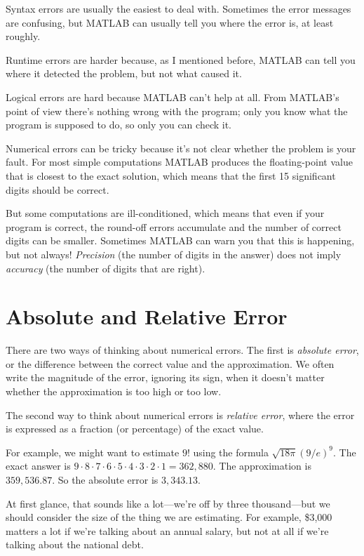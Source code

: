 Syntax errors are usually the easiest to deal with.  Sometimes the error messages
are confusing, but MATLAB can usually tell you where the error is, at
least roughly.

Runtime errors are harder because, as I mentioned before, MATLAB
can tell you where it detected the problem, but not what caused it.

Logical errors are hard because MATLAB can't help at all.  
From MATLAB's point of view there's nothing wrong with the program; only you
know what the program is supposed to do, so only you can check it.


Numerical errors can be tricky because it's not clear whether the
problem is your fault.  For most simple computations MATLAB produces
the floating-point value that is closest to the exact solution, which
means that the first 15 significant digits should be correct.  

But some computations are ill-conditioned, which means that even if your program is correct, the round-off errors accumulate and the number of correct digits can be smaller.  Sometimes MATLAB can warn you that
this is happening, but not always!  \emph{Precision} (the number of digits
in the answer) does not imply \emph{accuracy} (the number of digits that
are right).


\section{Absolute and Relative Error}

There are two ways of thinking about numerical errors. 
The first is \emph{absolute error}, or the difference between the correct value and the approximation.  We often write the magnitude of the error,
ignoring its sign, when it doesn't matter whether the approximation
is too high or too low.
 

The second way to think about numerical errors is \emph{relative error}, where the error is expressed as a fraction (or percentage) of the exact value.

For example, we might want to estimate $9!$ using the formula 
$\sqrt {18 \pi} ( 9 / e)^9$.  The exact answer is $9 \cdot 8 \cdot 7 \cdot 6
\cdot 5 \cdot 4 \cdot 3 \cdot 2 \cdot 1 = 362,880$.  The approximation
is $359,536.87$.  So the absolute error is $3,343.13$.

At first glance, that sounds like a lot---we're off by three
thousand---but we should consider the size of the
thing we are estimating.  For example, \$3,000 matters a lot
if we're talking about an annual salary, but not at all if we're talking about the national debt.


